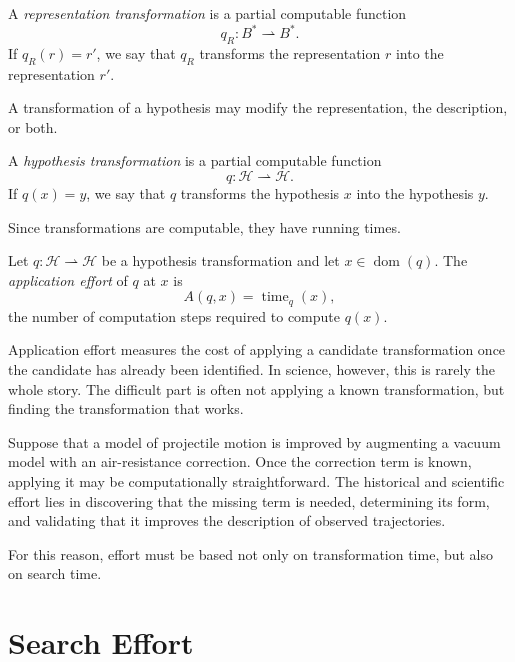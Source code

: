 \begin{definition}
A \emph{representation transformation} is a partial computable function
\[
q_R:B^{\ast}\rightharpoonup B^{\ast}.
\]
If \(q_R(r)=r'\), we say that \(q_R\) transforms the representation \(r\) into the representation \(r'\).
\end{definition}

A transformation of a hypothesis may modify the representation, the description, or both.

\begin{definition}
A \emph{hypothesis transformation} is a partial computable function
\[
q:\mathcal{H}\rightharpoonup \mathcal{H}.
\]
If \(q(x)=y\), we say that \(q\) transforms the hypothesis \(x\) into the hypothesis \(y\).
\end{definition}

Since transformations are computable, they have running times.

\begin{definition}
Let \(q:\mathcal{H}\rightharpoonup \mathcal{H}\) be a hypothesis transformation and let \(x\in\operatorname{dom}(q)\). The \emph{application effort} of \(q\) at \(x\) is
\[
A(q,x)=\operatorname{time}_{q}(x),
\]
the number of computation steps required to compute \(q(x)\).
\end{definition}

Application effort measures the cost of applying a candidate transformation once the candidate has already been identified. In science, however, this is rarely the whole story. The difficult part is often not applying a known transformation, but finding the transformation that works.

\begin{example}
Suppose that a model of projectile motion is improved by augmenting a vacuum model with an air-resistance correction. Once the correction term is known, applying it may be computationally straightforward. The historical and scientific effort lies in discovering that the missing term is needed, determining its form, and validating that it improves the description of observed trajectories.
\end{example}

For this reason, effort must be based not only on transformation time, but also on search time.

\section{Search Effort}
\label{sec:search_effort}

